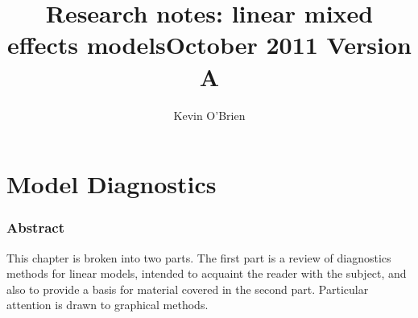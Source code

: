 \documentclass[12pt, a4paper]{report}
\title{Research notes: linear mixed effects models}
\author{ } \date{ }
\theoremstyle{plain}
\theoremstyle{definition}
\theoremstyle{remark}
\begin{document}
\author{Kevin O'Brien}
\title{October 2011 Version A}




\chapter{Model Diagnostics}
\tableofcontents
\newpage

\subsection*{Abstract}
This chapter is broken into two parts. The first part is a review of diagnostics methods for linear models, intended to acquaint the reader with the subject, and also to provide a basis for material covered in the second part. Particular attention is drawn to graphical methods.
\end{document}
